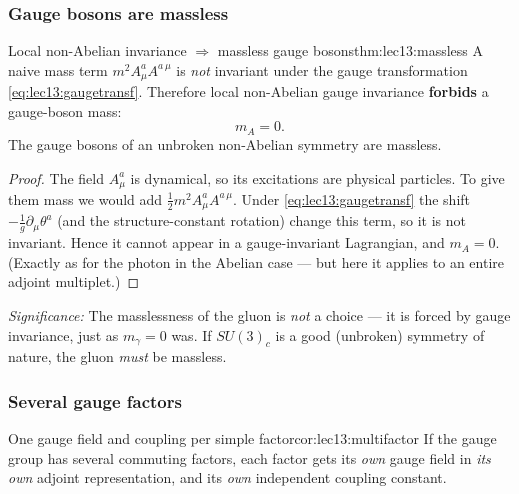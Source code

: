 \documentclass[../main.tex]{subfiles}
\begin{document}
\subsubsection*{Gauge bosons are massless}

\begin{Theorem}{Local non-Abelian invariance $\Rightarrow$ massless gauge bosons}{thm:lec13:massless}
A naive mass term $m^2 A_\mu^a A^{a\,\mu}$ is \emph{not} invariant under the gauge transformation \eqref{eq:lec13:gaugetransf}. Therefore local non-Abelian gauge invariance \textbf{forbids} a gauge-boson mass:
\begin{equation*}
  m_A = 0 .
\end{equation*}
The gauge bosons of an unbroken non-Abelian symmetry are massless.
\end{Theorem}

\begin{proof}
The field $A_\mu^a$ is dynamical, so its excitations are physical particles. To give them mass we would add $\tfrac12 m^2 A_\mu^a A^{a\,\mu}$. Under \eqref{eq:lec13:gaugetransf} the shift $-\tfrac1g\partial_\mu\theta^a$ (and the structure-constant rotation) change this term, so it is not invariant. Hence it cannot appear in a gauge-invariant Lagrangian, and $m_A=0$. (Exactly as for the photon in the Abelian case --- but here it applies to an entire adjoint multiplet.)
\end{proof}

\textit{Significance:} The masslessness of the gluon is \emph{not} a choice --- it is forced by gauge invariance, just as $m_\gamma=0$ was. If $SU(3)_c$ is a good (unbroken) symmetry of nature, the gluon \emph{must} be massless.

\subsubsection*{Several gauge factors}

\begin{Corollary}{One gauge field and coupling per simple factor}{cor:lec13:multifactor}
If the gauge group has several commuting factors, each factor gets its \emph{own} gauge field in \emph{its own} adjoint representation, and its \emph{own} independent coupling constant.
\end{Corollary}
\end{document}
